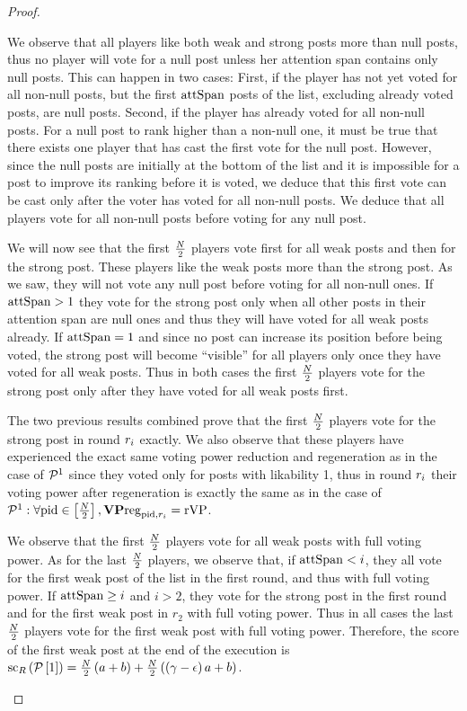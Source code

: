 \begin{proof}
\begin{itemize}
    We observe that all players like both weak and strong posts more than null
    posts, thus no player will vote for a null post unless her attention span
    contains only null posts. This can happen in two cases: First, if the player
    has not yet voted for all non-null posts, but the first $\mathrm{attSpan}$ posts of
    the list, excluding already voted posts, are null posts. Second, if the
    player has already voted for all non-null posts. For a null post to rank
    higher than a non-null one, it must be true that there exists one player
    that has cast the first vote for the null post. However, since the null
    posts are initially at the bottom of the list and it is impossible for a
    post to improve its ranking before it is voted, we deduce that this first
    vote can be cast only after the voter has voted for all non-null posts. We
    deduce that all players vote for all non-null posts before voting for any
    null post.

    We will now see that the first $\frac{N}{2}$ players vote first for
    all weak posts and then for the strong post. These players like the weak
    posts more than the strong post. As we saw, they will not vote any null
    post before voting for all non-null ones. If $\mathrm{attSpan} > 1$ they vote for
    the strong post only when all other posts in their attention span are null
    ones and thus they will have voted for all weak posts already. If $\mathrm{attSpan}
    = 1$ and since no post can increase its position before being voted, the
    strong post will become ``visible'' for all players only once they have
    voted for all weak posts. Thus in both cases the first
    $\frac{N}{2}$ players vote for the strong post only after they have
    voted for all weak posts first.

    The two previous results combined prove that the first
    $\frac{N}{2}$ players vote for the strong post in round $r_i$
    exactly. We also observe that these players have experienced the exact same
    voting power reduction and regeneration as in the case of $\mathcal{P}^1$
    since they voted only for posts with likability 1, thus in round $r_i$
    their voting power after regeneration is exactly the same as in the case of
    $\mathcal{P}^1: \forall \mathrm{pid} \in \left[\frac{N}{2}\right],
    \mathrm{\textbf{VP}reg}_{\mathrm{pid}, r_i} = \mathrm{rVP}$.

    We observe that the first $\frac{N}{2}$ players vote for all weak
    posts with full voting power. As for the last $\frac{N}{2}$
    players, we observe that, if $\mathrm{attSpan} < i$, they all vote for the first
    weak post of the list in the first round, and thus with full voting power. If
    $\mathrm{attSpan} \geq i$ and $i > 2$, they vote for the strong post in the first
    round and for the first weak post in $r_2$ with full voting power. Thus in
    all cases the last $\frac{N}{2}$ players vote for the first weak
    post with full voting power. Therefore, the score of the first weak post at
    the end of the execution is
    $\mathrm{sc}_{R}\left(\mathcal{P}\left[1\right]\right) =
    \frac{N}{2}\left(a + b\right) +
    \frac{N}{2}\left(\left(\gamma - \epsilon\right) a + b\right)$.


\end{itemize}
\end{proof}
